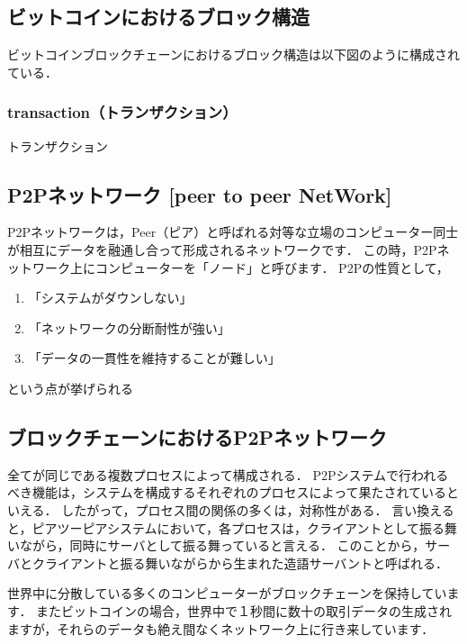 \documentclass[a4paper,12pt]{jsarticle}
\begin{document}
      \subsection*{ビットコインにおけるブロック構造}
ビットコインブロックチェーンにおけるブロック構造は以下図のように構成されている．


            \subsubsection{transaction（トランザクション）}
トランザクション


      \subsection{P2Pネットワーク [peer to peer NetWork]}%
P2Pネットワークは，Peer（ピア）と呼ばれる対等な立場のコンピューター同士が相互にデータを融通し合って形成されるネットワークです．
この時，P2Pネットワーク上にコンピューターを「ノード」と呼びます．
P2Pの性質として，
\begin{enumerate}
  \item 「システムがダウンしない」
  
  \item 「ネットワークの分断耐性が強い」
  
  \item 「データの一貫性を維持することが難しい」
  \end{enumerate}
という点が挙げられる

      \subsection*{ブロックチェーンにおけるP2Pネットワーク }
全てが同じである複数プロセスによって構成される．
P2Pシステムで行われるべき機能は，システムを構成するそれぞれのプロセスによって果たされているといえる．
したがって，プロセス間の関係の多くは，対称性がある．
言い換えると，ピアツーピアシステムにおいて，各プロセスは，クライアントとして振る舞いながら，同時にサーバとして振る舞っていると言える．
このことから，サーバとクライアントと振る舞いながらから生まれた造語サーバントと呼ばれる．

世界中に分散している多くのコンピューターがブロックチェーンを保持しています．
またビットコインの場合，世界中で１秒間に数十の取引データの生成されますが，それらのデータも絶え間なくネットワーク上に行き来しています．
\end{document}

